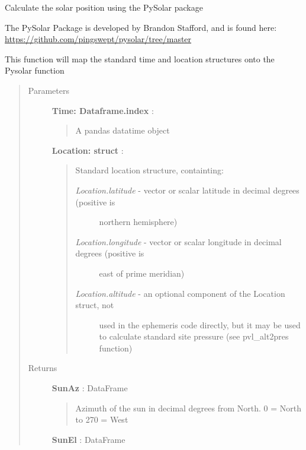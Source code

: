 \documentclass[letterpaper,10pt,english]{sphinxmanual}
\begin{document}
\begin{fulllineitems}
\label{stubs/pvlib.pvl_spa:pvlib.pvl_spa}
Calculate the solar position using the PySolar package

The PySolar Package is developed by Brandon Stafford, and is
found here: \href{https://github.com/pingswept/pysolar/tree/master}{https://github.com/pingswept/pysolar/tree/master}

This function will map the standard time and location structures
onto the Pysolar function
\begin{quote}\begin{description}
\item[{Parameters}] \leavevmode
\textbf{Time: Dataframe.index} :
\begin{quote}

A pandas datatime object
\end{quote}

\textbf{Location: struct} :
\begin{quote}

Standard location structure, containting:
\begin{description}
\item[{\emph{Location.latitude} - vector or scalar latitude in decimal degrees (positive is}] \leavevmode
northern hemisphere)

\item[{\emph{Location.longitude} - vector or scalar longitude in decimal degrees (positive is }] \leavevmode
east of prime meridian)

\item[{\emph{Location.altitude} - an optional component of the Location struct, not}] \leavevmode
used in the ephemeris code directly, but it may be used to calculate
standard site pressure (see pvl\_alt2pres function)

\end{description}
\end{quote}

\item[{Returns}] \leavevmode
\textbf{SunAz} : DataFrame
\begin{quote}

Azimuth of the sun in decimal degrees from North. 0 = North to 270 = West
\end{quote}

\textbf{SunEl} : DataFrame
\begin{quote}


\end{quote}
\end{description}
\end{quote}
\end{fulllineitems}
\end{document}

